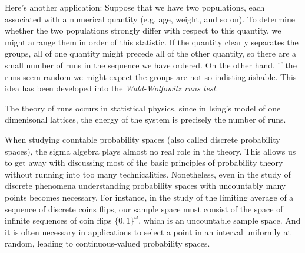 \begin{example}
    Here's another application: Suppose that we have two populations, each associated with a numerical quantity (e.g. age, weight, and so on). To determine whether the two populations strongly differ with respect to this quantity, we might arrange them in order of this statistic. If the quantity clearly separates the groups, all of one quantity might precede all of the other quantity, so there are a small number of runs in the sequence we have ordered. On the other hand, if the runs seem random we might expect the groups are not so indistinguishable. This idea has been developed into the \emph{Wald-Wolfowitz runs test}.

    The theory of runs occurs in statistical physics, since in Ising's model of one dimenisonal lattices, the energy of the system is precisely the number of runs.
\end{example}

When studying countable probability spaces (also called discrete probability spaces), the sigma algebra plays almost no real role in the theory. This allows us to get away with discussing most of the basic principles of probability theory without running into too many technicalities. Nonetheless, even in the study of discrete phenomena understanding probability spaces with uncountably many points becomes necessary. For instance, in the study of the limiting average of a sequence of discrete coins flips, our sample space must consist of the space of infinite sequences of coin flips $\{ 0, 1 \}^\omega$, which is an uncountable sample space. And it is often necessary in applications to select a point in an interval uniformly at random, leading to continuous-valued probability spaces.

